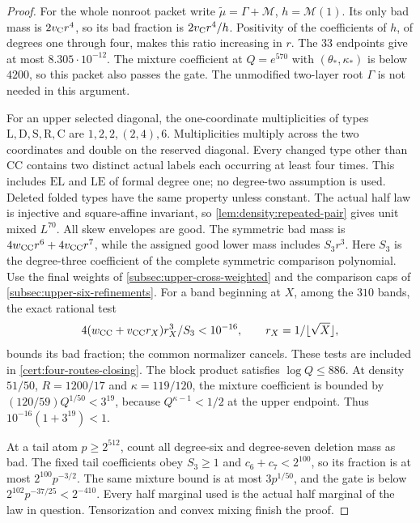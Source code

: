 \begin{proof}
For the whole nonroot packet write
$\widetilde\mu=\Gamma+\mathcal M$, $h=\mathcal M(1)$.
Its only bad mass is $2v_{\rm C}r^4$, so its bad fraction is
$2v_{\rm C}r^4/h$. Positivity of the coefficients of $h$, of degrees
one through four, makes this ratio increasing in $r$. The $33$ endpoints
give at most $8.305\cdot10^{-12}$. The mixture coefficient at
$Q=e^{570}$ with $(\theta_*,\kappa_*)$ is below $4200$, so this
packet also passes the gate.
The unmodified two-layer root $\Gamma$ is not needed in this argument.

For an upper selected diagonal, the one-coordinate multiplicities of
types $\mathrm L,\mathrm D,\mathrm S,\mathrm R,\mathrm C$ are
$1,2,2,(2,4),6$. Multiplicities multiply across the two coordinates and
double on the reserved diagonal. Every changed type other than
$\mathrm{CC}$ contains two distinct actual labels each occurring at
least four times. This includes $\mathrm{EL}$ and $\mathrm{LE}$ of
formal degree one; no degree-two assumption is used. Deleted folded
types have the same property unless constant. The actual half law is
injective and square-affine invariant, so
\cref{lem:density:repeated-pair} gives unit mixed $L^{70}$.
All skew envelopes are good. The symmetric bad mass is
$4w_{\rm CC}r^6+4v_{\rm CC}r^7$, while the assigned good lower mass
includes $S_3r^3$. Here $S_3$ is the degree-three coefficient of
the complete symmetric comparison polynomial.
Use the final weights of \cref{subsec:upper-cross-weighted} and
the comparison caps of \cref{subsec:upper-six-refinements}.
For a band beginning at $X$, among the $310$ bands, the exact rational test
\[
 \frac{4(w_{\rm CC}+v_{\rm CC}r_X)r_X^3}{S_3}<10^{-16},
 \qquad r_X=\frac1{\lfloor\sqrt X\rfloor},
\]
bounds its bad fraction; the common normalizer cancels.
These tests are included in \cref{cert:four-routes-closing}.
The block product satisfies $\log Q\le886$.
At density $51/50$, $R=1200/17$ and $\kappa=119/120$,
the mixture coefficient is bounded by
$(120/59)Q^{1/50}<3^{19}$, because
$Q^{\kappa-1}<1/2$ at the upper endpoint.
Thus $10^{-16}(1+3^{19})<1$.

At a tail atom $p\ge2^{512}$, count all degree-six and degree-seven
deletion mass as bad. The fixed tail coefficients obey
$S_3\ge1$ and $c_6+c_7<2^{100}$, so its fraction is at most
$2^{100}p^{-3/2}$. The same mixture bound is at most $3p^{1/50}$,
and the gate is below $2^{102}p^{-37/25}<2^{-410}$.
Every half marginal used is the actual half marginal of the law in question. Tensorization and convex mixing finish
the proof.
\end{proof}

